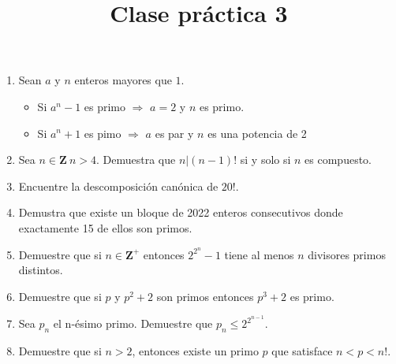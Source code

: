 \documentclass{article}
\begin{document}
\title{Clase pr\'actica 3}
\maketitle

\begin{enumerate}
    \item Sean $a$ y $n$ enteros mayores que $1$.
    \begin{itemize}
        \item Si $a^n - 1$ es primo $\Rightarrow$ $a=2$ y $n$ es primo.
        \item Si $a^n + 1$ es pimo $\Rightarrow$ $a$ es par y $n$ es una potencia de 2
    \end{itemize}

    \item Sea $n \in \mathbf{Z} ~ n>4$. Demuestra que $n|(n-1)!$ si y solo si $n$ es compuesto.
    
    \item Encuentre la descomposición canónica de $20!$.
    
    \item Demustra que existe un bloque de 2022 enteros consecutivos donde exactamente 15 de ellos son primos.

    \item Demuestre que si $n \in \mathbf{Z^+}$ entonces $2^{2^n} - 1$ tiene al menos $n$ divisores primos distintos.
     
    \item Demuestre que si $p$ y $p^2+2$ son primos entonces $p^3+2$ es primo.
    
    \item Sea $p_n$ el n-\'esimo primo. Demuestre que $p_n \leq 2^{2^{n-1}}$.
    
    \item Demuestre que si $n > 2$, entonces existe un primo $p$ que satisface $n < p < n!$.
\end{enumerate}
\end{document}
